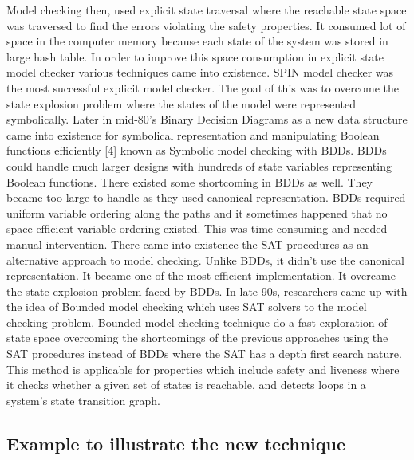 \documentclass{article}
\begin{document}
Model checking then, used explicit state traversal where the reachable state space was traversed to find the errors violating the safety properties. It consumed lot of space in the computer memory because each state of the system was stored in large hash table. In order to improve this space consumption in explicit state model checker various techniques came into existence. SPIN model checker was the most successful explicit model checker. The goal of this was to overcome the state explosion problem where the states of the model were represented symbolically. Later in mid-80’s Binary Decision Diagrams as a new data structure came into existence for symbolical representation and manipulating Boolean functions efficiently [4] known as Symbolic model checking with BDDs. BDDs could handle much larger designs with hundreds of state variables representing Boolean functions. There existed some shortcoming in BDDs as well. They became too large to handle as they used canonical representation. BDDs required uniform variable ordering along the paths and it sometimes happened that no space efficient variable ordering existed. This was time consuming and needed manual intervention. There came into existence the SAT procedures as an alternative approach to model checking. Unlike BDDs, it didn’t use the canonical representation. It became one of the most efficient implementation. It overcame the state explosion problem faced by BDDs. In late 90s, researchers came up with the idea of Bounded model checking which uses SAT solvers to the model checking problem. Bounded model checking technique do a fast exploration of state space overcoming the shortcomings of the previous approaches using the SAT procedures instead of BDDs where the SAT has a depth first search nature. This method is applicable for properties which include safety and liveness where it checks whether a given set of states is reachable, and detects loops in a system’s state transition graph. 


\subsection{Example to illustrate the new technique}
\label{sec:exampleillust}
\end{document}
